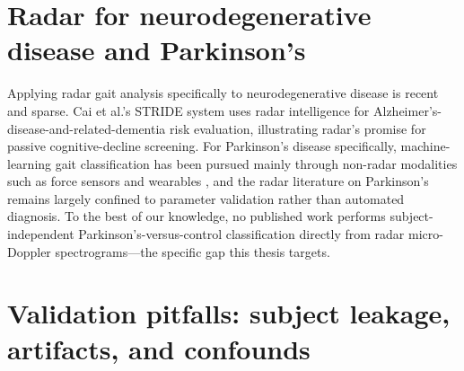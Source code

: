 \section{Radar for neurodegenerative disease and Parkinson's}
\label{sec:neuro}

Applying radar gait analysis specifically to neurodegenerative disease is
recent and sparse. Cai et al.'s STRIDE system \cite{cai2023} uses radar
intelligence for Alzheimer's-disease-and-related-dementia risk evaluation,
illustrating radar's promise for passive cognitive-decline screening. For
Parkinson's disease specifically, machine-learning gait classification has been
pursued mainly through non-radar modalities such as force sensors and wearables
\cite{neurosurgery2025}, and the radar literature on Parkinson's remains largely
confined to parameter validation \cite{lopezdelgado2026} rather than automated
diagnosis. To the best of our knowledge, no published work performs
subject-independent Parkinson's-versus-control classification directly from
radar micro-Doppler spectrograms---the specific gap this thesis targets.

\section{Validation pitfalls: subject leakage, artifacts, and confounds}
\label{sec:pitfalls}

